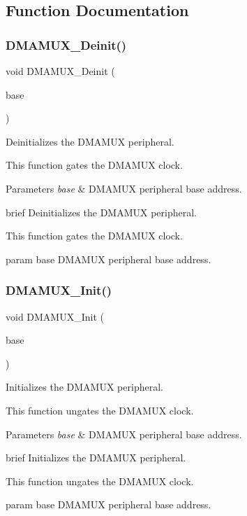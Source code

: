 \subsection{Function Documentation}
\mbox{\label{group__dmamux_gab663257d094b9b7b6fa1b894fbf8000b}} 
\subsubsection{\texorpdfstring{DMAMUX\_Deinit()}{DMAMUX\_Deinit()}}
{\footnotesize\ttfamily void D\+M\+A\+M\+U\+X\+\_\+\+Deinit (\begin{DoxyParamCaption}\item[{\mbox{\hyperlink{struct_d_m_a_m_u_x___type}{D\+M\+A\+M\+U\+X\+\_\+\+Type}} $\ast$}]{base }\end{DoxyParamCaption})}



Deinitializes the D\+M\+A\+M\+UX peripheral. 

This function gates the D\+M\+A\+M\+UX clock.


\begin{DoxyParams}{Parameters}
{\em base} & D\+M\+A\+M\+UX peripheral base address.\\
\hline
\end{DoxyParams}
brief Deinitializes the D\+M\+A\+M\+UX peripheral.

This function gates the D\+M\+A\+M\+UX clock.

param base D\+M\+A\+M\+UX peripheral base address. \mbox{\label{group__dmamux_ga850545ac61a004df8ca312db2ca9db73}} 
\subsubsection{\texorpdfstring{DMAMUX\_Init()}{DMAMUX\_Init()}}
{\footnotesize\ttfamily void D\+M\+A\+M\+U\+X\+\_\+\+Init (\begin{DoxyParamCaption}\item[{\mbox{\hyperlink{struct_d_m_a_m_u_x___type}{D\+M\+A\+M\+U\+X\+\_\+\+Type}} $\ast$}]{base }\end{DoxyParamCaption})}



Initializes the D\+M\+A\+M\+UX peripheral. 

This function ungates the D\+M\+A\+M\+UX clock.


\begin{DoxyParams}{Parameters}
{\em base} & D\+M\+A\+M\+UX peripheral base address.\\
\hline
\end{DoxyParams}
brief Initializes the D\+M\+A\+M\+UX peripheral.

This function ungates the D\+M\+A\+M\+UX clock.

param base D\+M\+A\+M\+UX peripheral base address. 
